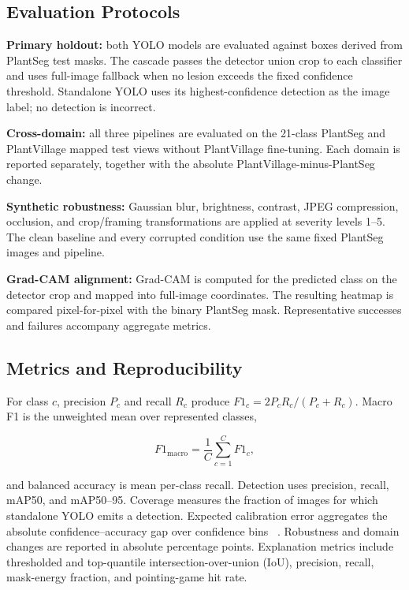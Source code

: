 \documentclass[conference]{IEEEtran}
\begin{document}
\subsection{Evaluation Protocols}

\textbf{Primary holdout:} both YOLO models are evaluated against boxes derived from PlantSeg test
masks. The cascade passes the detector union crop to each classifier and uses full-image fallback
when no lesion exceeds the fixed confidence threshold. Standalone YOLO uses its highest-confidence
detection as the image label; no detection is incorrect.

\textbf{Cross-domain:} all three pipelines are evaluated on the 21-class PlantSeg and PlantVillage
mapped test views without PlantVillage fine-tuning. Each domain is reported separately, together
with the absolute PlantVillage-minus-PlantSeg change.

\textbf{Synthetic robustness:} Gaussian blur, brightness, contrast, JPEG compression, occlusion,
and crop/framing transformations are applied at severity levels 1--5. The clean baseline and every
corrupted condition use the same fixed PlantSeg images and pipeline.

\textbf{Grad-CAM alignment:} Grad-CAM is computed for the predicted class on the detector crop and
mapped into full-image coordinates. The resulting heatmap is compared pixel-for-pixel with the
binary PlantSeg mask. Representative successes and failures accompany aggregate metrics.

\subsection{Metrics and Reproducibility}

For class $c$, precision $P_c$ and recall $R_c$ produce
$F1_c=2P_cR_c/(P_c+R_c)$. Macro F1 is the unweighted mean over represented classes,

\begin{equation}
F1_{\mathrm{macro}}=\frac{1}{C}\sum_{c=1}^{C}F1_c,
\end{equation}

and balanced accuracy is mean per-class recall. Detection uses precision, recall, mAP50, and
mAP50--95. Coverage measures the fraction of images for which standalone YOLO emits a detection.
Expected calibration error aggregates the absolute confidence--accuracy gap over confidence bins
~\cite{guo2017calibration}. Robustness and domain changes are reported in absolute percentage
points. Explanation metrics include thresholded and top-quantile intersection-over-union (IoU),
precision, recall, mask-energy fraction, and pointing-game hit rate.
\end{document}
